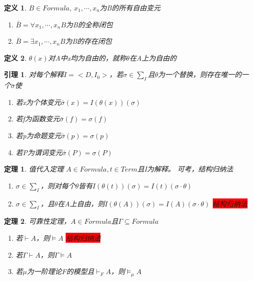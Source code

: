 \documentclass[a4paper]{ctexart}
\newtheorem{thm}{\hspace{2em}定理}[subsection]
\newtheorem{lem}{\hspace{2em}引理}
\newtheorem{defi}{\hspace{2em}定义}[subsection]
\newcommand{\shade}[1]{\colorbox{shadecolor}{#1}}
\newcommand{\redshade}[1]{\colorbox{red}{#1}}
\begin{document}
\begin{defi}
  $B\in Formula,\ x_1,\cdots,x_n$为B的所有自由变元
  \begin{enumerate}[itemindent=2em]
    \item $\bar{B}=\forall{x_1,\cdots,x_n}B$为B的全称闭包
    \item $\bar{B}=\exists{x_1,\cdots,x_n}B$为B的存在闭包
  \end{enumerate}
\end{defi}

\begin{defi}
  $\theta(x)$对A中x均为自由的，就称$\theta$在A上为自由的
\end{defi}

\begin{lem}
  对每个解释$I=<D,I_0>$，若$\sigma\in\sum_I$且$\theta$为一个替换，则存在唯一的一个$\bar{\sigma}$使
  \begin{enumerate}[itemindent=2em]
    \item 若x为个体变元$\bar{\sigma}(x)=I(\theta(x))(\sigma)$
    \item 若f为函数变元$\bar{\sigma}(f)=\sigma(f)$
    \item 若p为命题变元$\bar{\sigma}(p)=\sigma(p)$
    \item 若P为谓词变元$\bar{\sigma}(P)=\sigma(P)$
  \end{enumerate}
\end{lem}

\begin{thm}
  值代入定理 $A\in Formula,t\in Term$且I为解释。 \shade{可考，结构归纳法}
  \begin{enumerate}[itemindent=2em]
    \item $\sigma\in\sum_I$，则对每个$\theta$皆有$I(\theta(t))(\sigma)=I(t)(\sigma\cdot\theta)$
    \item $\sigma\in\sum_I$，且$\theta$在A上自由，则$I(\theta(A))(\sigma)=I(A)(\sigma\cdot\theta)$ \redshade{结构归纳法}
  \end{enumerate}
\end{thm}

\begin{thm}
  可靠性定理，$A\in Formula$且$\Gamma\subseteq Formula$
  \begin{enumerate}[itemindent=2em]
    \item 若$\vdash A$，则$\models A$  \redshade{结构归纳法}
    \item 若$\Gamma\vdash A$，则$\Gamma\models A$
    \item 若$\mu$为一阶理论F的模型且$\vdash_FA$，则$\models_\mu A$
  \end{enumerate}
\end{thm}
\end{document}
